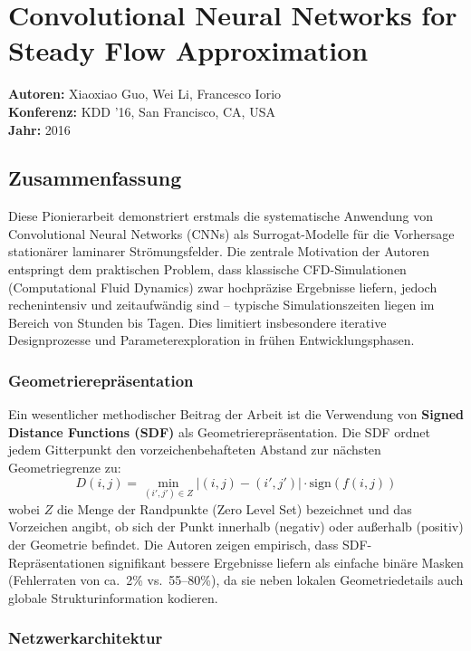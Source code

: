 \documentclass[a4paper,12pt]{article}
\begin{document}
\section*{Convolutional Neural Networks for Steady Flow Approximation}
\textbf{Autoren:} Xiaoxiao Guo, Wei Li, Francesco Iorio \\
\textbf{Konferenz:} KDD '16, San Francisco, CA, USA \\
\textbf{Jahr:} 2016

\subsection*{Zusammenfassung}

Diese Pionierarbeit demonstriert erstmals die systematische Anwendung von Convolutional Neural Networks (CNNs) als Surrogat-Modelle für die Vorhersage stationärer laminarer Strömungsfelder. Die zentrale Motivation der Autoren entspringt dem praktischen Problem, dass klassische CFD-Simulationen (Computational Fluid Dynamics) zwar hochpräzise Ergebnisse liefern, jedoch rechenintensiv und zeitaufwändig sind -- typische Simulationszeiten liegen im Bereich von Stunden bis Tagen. Dies limitiert insbesondere iterative Designprozesse und Parameterexploration in frühen Entwicklungsphasen.

\subsubsection*{Geometrierepräsentation}

Ein wesentlicher methodischer Beitrag der Arbeit ist die Verwendung von \textbf{Signed Distance Functions (SDF)} als Geometrierepräsentation. Die SDF ordnet jedem Gitterpunkt den vorzeichenbehafteten Abstand zur nächsten Geometriegrenze zu:
\begin{equation}
D(i,j) = \min_{(i',j') \in Z} \left| (i,j) - (i',j') \right| \cdot \text{sign}(f(i,j))
\end{equation}
wobei $Z$ die Menge der Randpunkte (Zero Level Set) bezeichnet und das Vorzeichen angibt, ob sich der Punkt innerhalb (negativ) oder außerhalb (positiv) der Geometrie befindet. Die Autoren zeigen empirisch, dass SDF-Repräsentationen signifikant bessere Ergebnisse liefern als einfache binäre Masken (Fehlerraten von ca.\ 2\% vs.\ 55--80\%), da sie neben lokalen Geometriedetails auch globale Strukturinformation kodieren.

\subsubsection*{Netzwerkarchitektur}
\end{document}
